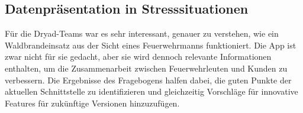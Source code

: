 \subsection{Datenpräsentation in Stresssituationen}

Für die Dryad-Teams war es sehr interessant, genauer zu verstehen, wie ein Waldbrandeinsatz aus der Sicht eines Feuerwehrmanns funktioniert.
Die App ist zwar nicht für sie gedacht, aber sie wird dennoch relevante Informationen enthalten, um die Zusammenarbeit zwischen Feuerwehrleuten und Kunden zu verbessern.
Die Ergebnisse des Fragebogens halfen dabei, die guten Punkte der aktuellen Schnittstelle zu identifizieren und gleichzeitig Vorschläge für innovative Features für zukünftige Versionen hinzuzufügen.
